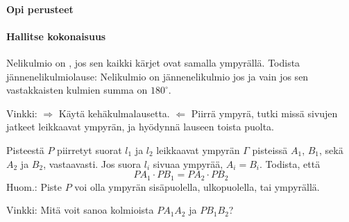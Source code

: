 \begin{tehtavasivu}

\paragraph*{Opi perusteet}

\paragraph*{Hallitse kokonaisuus}

\begin{tehtava}
Nelikulmio on , jos sen kaikki kärjet ovat samalla ympyrällä. Todista jännenelikulmiolause: Nelikulmio on jännenelikulmio jos ja vain jos sen vastakkaisten kulmien summa on $180^{\circ}$.
\begin{vastaus}
Vinkki: $\Rightarrow$ Käytä kehäkulmalausetta. $\Leftarrow$ Piirrä ympyrä, tutki missä sivujen jatkeet leikkaavat ympyrän, ja hyödynnä lauseen toista puolta.
\end{vastaus}
\end{tehtava}

\begin{tehtava}
Pisteestä $P$ piirretyt suorat $l_1$ ja $l_2$ leikkaavat ympyrän $\Gamma$ pisteissä $A_1$, $B_1$, sekä $A_2$ ja $B_2$, vastaavasti. Jos suora $l_{i}$ sivuaa ympyrää, $A_{i} = B_{i}$. Todista, että
\[
PA_{1}\cdot PB_{1} = PA_{2}\cdot PB_{2}
\]
Huom.: Piste $P$ voi olla ympyrän sisäpuolella, ulkopuolella, tai ympyrällä.
\begin{vastaus}
Vinkki: Mitä voit sanoa kolmioista $PA_1A_2$ ja $PB_1B_2$?
\end{vastaus}
\end{tehtava}

\end{tehtavasivu}
